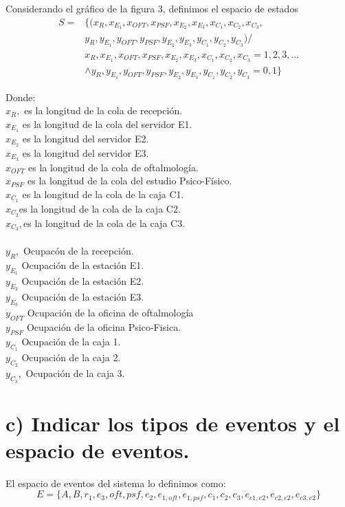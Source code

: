 \documentclass{article}
\numberwithin{equation}{section}
\numberwithin{figure}{section}
\numberwithin{table}{section}
\begin{document}
Considerando el gr\'afico de la figura 3,  definimos el espacio de estados
\begin{align*}
 S =& \{ ( x_R, x_{E_1}, x_{OFT}, x_ {PSF}, x_{E_2}, x_{E_3}, x_{C_1}, x_{C_2}, x_{C_3}, \\
&y_R, y_{E_1}, y_{OFT}, y_ {PSF}, y_{E_2}, y_{E_3}, y_{C_1}, y_{C_2}, y_{C_3} ) / \\
& x_R, x_{E_1}, x_{OFT}, x_ {PSF}, x_{E_2}, x_{E_3}, x_{C_1}, x_{C_2}, x_{C_3} = 1, 2, 3, ...\\
    & \wedge y_R, y_{E_1}, y_{OFT}, y_ {PSF}, y_{E_2}, y_{E_3}, y_{C_1}, y_{C_2}, y_{C_3} =  0, 1  \}
\end{align*}

Donde: \\
 $x_R,$ es la longitud de la cola de recepci\'on.\\
$x_{E_1}$ es la longitud de la cola del servidor E1.\\
$x_{E_2}$ es la longitud del servidor E2.\\
$x_{E_3}$ es la longitud del servidor E3.\\
$ x_{OFT}$ es la longitud de la cola de oftalmolog\'ia.\\
$x_ {PSF}$ es la longitud de la cola del estudio Psico-F\'isico.\\
$x_{C_1}$ es la longitud de la cola de la caja C1.\\
$x_{C_2}$es la longitud de la cola de la caja C2.\\
$x_{C_3},$es la longitud de la cola de la caja C3.\\ \\
\noindent
$y_R,$ Ocupac\'on de la recepci\'on.\\
$y_{E_1}$ Ocupaci\'on de la estaci\'on E1.\\
$y_{E_2}$ Ocupaci\'on de la  estaci\'on E2.\\
$y_{E_3}$ Ocupaci\'on de la  estaci\'on E3.\\
$ y_{OFT}$ Ocupaci\'on de la oficina de oftalmolog\'ia\\
$y_ {PSF}$ Ocupaci\'on de la oficina Psico-Fisica.\\
$y_{C_1}$ Ocupaci\'on de la caja 1.\\
$y_{C_2}$ Ocupaci\'on de la caja 2.\\
$y_{C_3},$ Ocupaci\'on de la caja 3.\\

\section*{c) Indicar los tipos de eventos y el espacio de eventos.}
El espacio de eventos del sistema lo definimos como:\\
\begin{equation*}
E = \{ A, B, r_1, e_3, oft, psf, e_2, e_{1, oft}, e_{1, psf}, c_1, c_2, c_3, e_{c1,e2}, e_{c2,e2}, e_{c3, e2} \}
\end{equation*}
\end{document}

